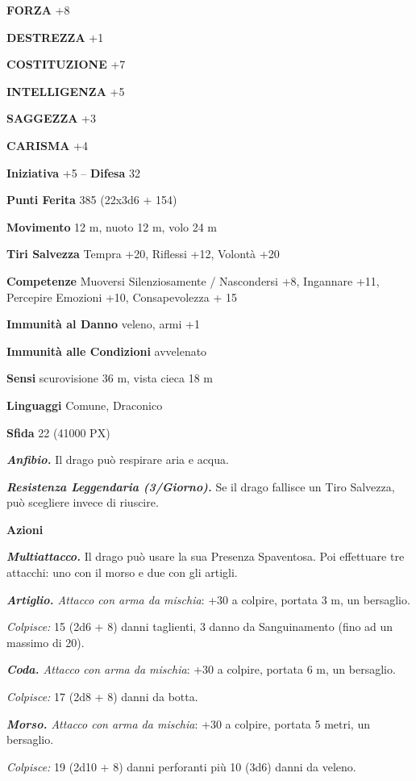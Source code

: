 \begin{multicols}{2}
	\textbf{FORZA} +8

	\textbf{DESTREZZA} +1

	\textbf{COSTITUZIONE} +7

	\textbf{INTELLIGENZA} +5

	\textbf{SAGGEZZA} +3

	\textbf{CARISMA} +4

	\textbf{Iniziativa} +5 -- \textbf{Difesa} 32

	\textbf{Punti Ferita} 385 (22x3d6 + 154)

	\textbf{Movimento} 12 m, nuoto 12 m, volo 24 m

	\textbf{Tiri Salvezza} Tempra +20, Riflessi +12, Volontà +20

	\textbf{Competenze} Muoversi Silenziosamente / Nascondersi +8, Ingannare +11, Percepire Emozioni +10, Consapevolezza + 15

	\textbf{Immunità al Danno} veleno, armi +1

	\textbf{Immunità alle Condizioni}
	avvelenato

	\textbf{Sensi} scurovisione 36 m, vista cieca 18 m

	\textbf{Linguaggi} Comune, Draconico

	\textbf{Sfida} 22 (41000 PX)

	\textit{\textbf{Anfibio.}} Il drago può respirare aria e acqua.

	\textit{\textbf{Resistenza Leggendaria (3/Giorno).}} Se il drago fallisce un Tiro Salvezza, può scegliere invece di riuscire.

	\textbf{Azioni}

	\textit{\textbf{Multiattacco.}} Il drago può usare la sua Presenza Spaventosa. Poi effettuare tre attacchi: uno con il morso e due con gli artigli.

	\textit{\textbf{Artiglio.} Attacco con arma da mischia}: +30 a colpire, portata 3 m, un bersaglio.

	\textit{Colpisce:} 15 (2d6 + 8) danni taglienti, 3 danno da Sanguinamento (fino ad un massimo di 20).

	\textit{\textbf{Coda.} Attacco con arma da mischia}: +30 a colpire, portata 6 m, un bersaglio.

	\textit{Colpisce:} 17 (2d8 + 8) danni da botta.

	\textit{\textbf{Morso.} Attacco con arma da mischia}: +30 a colpire, portata 5 metri, un bersaglio.

	\textit{Colpisce:} 19 (2d10 + 8) danni perforanti più 10 (3d6) danni da veleno.


\end{multicols}

